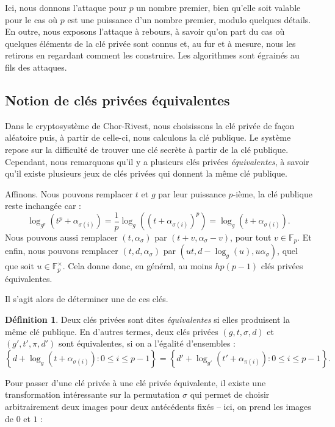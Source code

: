 \documentclass[a4paper, titlepage, 11pt]{article}
\theoremstyle{definition}
\newtheorem{defi}[theo]{Définition}
\theoremstyle{remark}
\def\gf #1{\mathbb{F}_{#1}}
\begin{document}
Ici, nous donnons l'attaque pour $p$ un nombre premier, bien qu'elle soit valable pour le cas où $p$ est une puissance d'un nombre premier, modulo quelques détails. En outre, nous exposons l'attaque à rebours, à savoir qu'on part du cas où quelques éléments de la clé privée sont connus et, au fur et à mesure, nous les retirons en regardant comment les construire. Les algorithmes sont égrainés au fils des attaques.

\subsection{Notion de clés privées équivalentes}

Dans le cryptosystème de Chor-Rivest, nous choisissons la clé privée de façon aléatoire puis, à partir de celle-ci, nous calculons la clé publique. Le système repose sur la difficulté de trouver une clé secrète à partir de la clé publique. Cependant, nous remarquons qu'il y a plusieurs clés privées \textit{équivalentes}, à savoir qu'il existe plusieurs jeux de clés privées qui donnent la même clé publique.

Affinons. Nous pouvons remplacer $t$ et $g$ par leur puissance $p$-ième, la clé publique reste inchangée car :
$$\log_{g^p}\left(t^p + \alpha_{\sigma(i)}\right) = \frac{1}{p}\log_{g}\left(\left(t + \alpha_{\sigma(i)}\right)^p\right) = \log_{g}\left(t + \alpha_{\sigma(i)}\right).$$
Nous pouvons aussi remplacer $(t, \alpha_{\sigma})$ par $(t + v, \alpha_{\sigma} - v)$, pour tout $v \in \gf{p}$. Et enfin, nous pouvons remplacer $(t,d,\alpha_\sigma)$ par $(ut, d - \log_g(u), u\alpha_\sigma)$, quel que soit $u \in \gf{p}^\times$.
Cela donne donc, en général, au moins $hp(p-1)$ clés privées équivalentes.

Il s'agit alors de déterminer une de ces clés.


\begin{defi}
Deux clés privées sont dites \textit{équivalentes} si elles produisent la même clé publique. En d'autres termes, deux clés privées $(g,t,\sigma,d)$ et $(g',t',\pi ,d')$ sont équivalentes, si on a l'égalité d'ensembles :
$$\left\{d + \log_g(t + \alpha_{\sigma(i)}) : 0\leqslant i \leqslant p-1\right\} = \left\{d' + \log_{g'}(t' + \alpha_{\pi(i)}) : 0\leqslant i \leqslant p-1\right\}.$$
\end{defi}

Pour passer d'une clé privée à une clé privée équivalente, il existe une transformation intéressante sur la permutation $\sigma$ qui permet de choisir arbitrairement deux images pour deux antécédents fixés -- ici, on prend les images de $0$ et $1$ :
\end{document}

